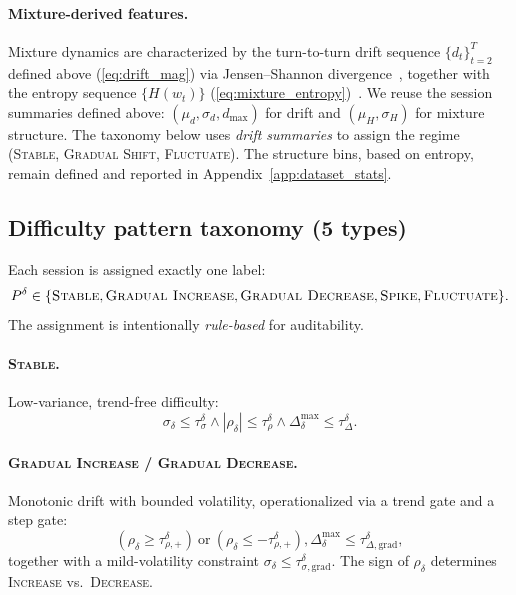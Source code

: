 \paragraph{Mixture-derived features.}
Mixture dynamics are characterized by the turn-to-turn drift sequence $\{d_t\}_{t=2}^{T}$ defined above (\eqref{eq:drift_mag}) via Jensen--Shannon divergence~\citep{lin1991divergence}, together with the entropy sequence $\{H(w_t)\}$ (\eqref{eq:mixture_entropy})~\citep{shannon1948}.
We reuse the session summaries defined above: $\left(\mu_d,\sigma_d,d_{\max}\right)$ for drift and $(\mu_H,\sigma_H)$ for mixture structure.
The taxonomy below uses \emph{drift summaries} to assign the regime (\textsc{Stable}, \textsc{Gradual Shift}, \textsc{Fluctuate}). The structure bins, based on entropy, remain defined and reported in Appendix~\ref{app:dataset_stats}.

\subsection{Difficulty pattern taxonomy (5 types)}
\label{app:pattern_difficulty}

Each session is assigned exactly one label: 
\begin{align*}
    P^\delta \in \{\textsc{Stable},\textsc{Gradual Increase},
    \textsc{Gradual Decrease},\textsc{Spike},\textsc{Fluctuate}\}.
\end{align*}
The assignment is intentionally \emph{rule-based} for auditability.

\paragraph{\textsc{Stable}.}
Low-variance, trend-free difficulty:
\begin{equation}
\label{eq:pat_stable}
\sigma_\delta \le \tau_{\sigma}^{\delta}
 \wedge 
|\rho_\delta| \le \tau_{\rho}^{\delta}
 \wedge 
\Delta^{\max}_\delta \le \tau_{\Delta}^{\delta}.
\end{equation}

\paragraph{\textsc{Gradual Increase} / \textsc{Gradual Decrease}.}
Monotonic drift with bounded volatility, operationalized via a trend gate and a step gate:
\begin{equation}
\label{eq:pat_gradual}
\left(\rho_\delta \ge \tau_{\rho,+}^{\delta}\right)
\ \text{or}\
\left(\rho_\delta \le -\tau_{\rho,+}^{\delta}\right),
\Delta^{\max}_\delta \le \tau_{\Delta,\mathrm{grad}}^{\delta},
\end{equation}
together with a mild-volatility constraint $\sigma_\delta \le \tau_{\sigma,\mathrm{grad}}^{\delta}$.
The sign of $\rho_\delta$ determines \textsc{Increase} vs.\ \textsc{Decrease}.

